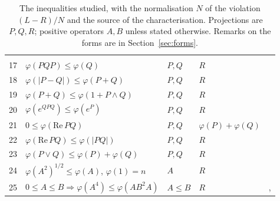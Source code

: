 \documentclass[11pt]{article}
\renewcommand{\Re}{\mathrm{Re}\,}
\theoremstyle{plain}
\theoremstyle{definition}
\theoremstyle{remark}
\begin{document}
\begin{table}[h]
\begin{tabular}{rllll}
\cite[Lemma~1]{bikchentaev2011pb}\\
17 & $\varphi(PQP)\le\varphi(Q)$ & $P,Q$ & $R$ & \cite[Thm.~3.4(iv)]{bikchentaev2010smj}\\
18 & $\varphi(|P-Q|)\le\varphi(P+Q)$ & $P,Q$ & $R$ & \cite[Thm.~3.4(v)]{bikchentaev2010smj}\\
19 & $\varphi(P+Q)\le\varphi(1+P\wedge Q)$ & $P,Q$ & $R$ & \cite[Thm.~3.4(iii)]{bikchentaev2010smj}\\
20 & $\varphi(e^{QPQ})\le\varphi(e^P)$ & $P,Q$ & $R$ & \cite[Thm.~2(v)]{bikchentaev2011mn}\\
21 & $0\le\varphi(\Re PQ)$ & $P,Q$ & $\varphi(P)+\varphi(Q)$ & \cite[Thm.~2(vi)]{bikchentaev2011mn}\\
22 & $\varphi(\Re PQ)\le\varphi(|PQ|)$ & $P,Q$ & $R$ & \cite[Thm.~2(vii)]{bikchentaev2011mn}\\
23 & $\varphi(P\vee Q)\le\varphi(P)+\varphi(Q)$ & $P,Q$ & $R$ & \cite[Thm.~4]{petz1988}\\
24 & $\varphi(A^2)^{1/2}\le\varphi(A)$, $\varphi(1)=n$ & $A$ & $R$ & \cite[Thm.~3(vii)]{bikchentaev2020det}\\
25 & $0\le A\le B\Rightarrow\varphi(A^4)\le\varphi(AB^2A)$ & $A\le B$ & $R$ & \cite[Thms.~4, 5, $r=1$]{hoa2010}, \cite{hoa2007}\\
\bottomrule
\end{tabular}
\caption{The inequalities studied, with the normalisation $N$ of the violation $(L-R)/N$ and the source of the
characterisation. Projections are $P,Q,R$; positive operators $A,B$ unless stated otherwise. Remarks on the forms are
in Section~\ref{sec:forms}.}
\label{tab:items}
\end{table}
\end{document}
